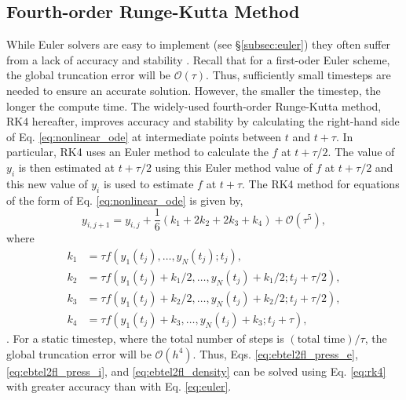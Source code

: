\subsection{Fourth-order Runge-Kutta Method}
\label{subsec:rk4}
%
\par  While Euler solvers are easy to implement (see \S\ref{subsec:euler}) they often suffer from a lack of accuracy and stability \citep{press_numerical_1992}. Recall that for a first-oder Euler scheme, the global truncation error will be $\mathcal{O}(\tau)$. Thus, sufficiently small timesteps are needed to ensure an accurate solution. However, the smaller the timestep, the longer the compute time. The widely-used fourth-order Runge-Kutta method, RK4 hereafter, improves accuracy and stability by calculating the right-hand side of Eq. \ref{eq:nonlinear_ode} at intermediate points between $t$ and $t+\tau$. In particular, RK4 uses an Euler method to calculate the $f$ at $t+\tau/2$. The value of $y_i$ is then estimated at $t+\tau/2$ using this Euler method value of $f$ at $t+\tau/2$ and this new value of $y_i$ is used to estimate $f$ at $t+\tau$. The RK4 method for equations of the form of Eq. \ref{eq:nonlinear_ode} is given by,
\begin{equation}
	\label{eq:rk4}
	y_{i,j+1} = y_{i,j} + \frac{1}{6}(k_1 + 2k_2 + 2k_3 + k_4) + \mathcal{O}(\tau^5),
\end{equation}
where
\begin{align}
	k_1 &= \tau f(y_1(t_j),\ldots,y_N(t_j);t_j),\\[0.5em]
	k_2 &= \tau f(y_1(t_j) + k_1/2,\ldots,y_N(t_j) + k_1/2; t_j+\tau/2),\\[0.5em]
	k_3 &= \tau f(y_1(t_j) + k_2/2,\ldots,y_N(t_j) + k_2/2; t_j+\tau/2),\\[0.5em]
	k_4 &= \tau f(y_1(t_j) + k_3,\ldots,y_N(t_j) + k_3; t_j + \tau),
\end{align}
\citep{press_numerical_1992}. For a static timestep, where the total number of steps is $(\text{total time})/\tau$, the global truncation error will be $\mathcal{O}(h^4)$. Thus, Eqs. \ref{eq:ebtel2fl_press_e}, \ref{eq:ebtel2fl_press_i}, and \ref{eq:ebtel2fl_density} can be solved using Eq. \ref{eq:rk4} with greater accuracy than with Eq. \ref{eq:euler}.
%
